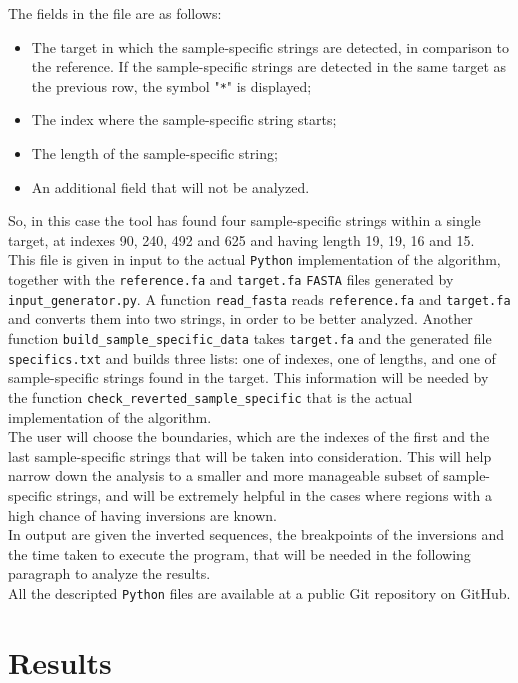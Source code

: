 The fields in the file are as follows:
\begin{itemize}
\item The target in which the sample-specific strings are detected, in comparison to the reference. If the sample-specific strings are detected in the same target as the previous row, the symbol "\texttt{*}" is displayed;
\item The index where the sample-specific string starts;
\item The length of the sample-specific string;
\item An additional field that will not be analyzed. 
\end{itemize}

So, in this case the tool has found four sample-specific strings within a single target, at indexes 90, 240, 492 and 625 and having length 19, 19, 16 and 15. \\
This file is given in input to the actual \texttt{Python} implementation of the algorithm, together with the \texttt{reference.fa} and \texttt{target.fa} \texttt{FASTA} files generated by \texttt{input\_generator.py}. A function \texttt{read\_fasta} reads \texttt{reference.fa} and \texttt{target.fa} and converts them into two strings, in order to be better analyzed. Another function \texttt{build\_sample\_specific\_data} takes  \texttt{target.fa} and the generated file  \texttt{specifics.txt} and builds three lists: one of indexes, one of lengths, and one of sample-specific strings found in the target. This information will be needed by the function  \texttt{check\_reverted\_sample\_specific} that is the actual implementation of the algorithm. \\
The user will choose the boundaries, which are the indexes of the first and the last sample-specific strings that will be taken into consideration. This will help narrow down the analysis to a smaller and more manageable subset of sample-specific strings, and will be extremely helpful in the cases where regions with a high chance of having inversions are known. \\
In output are given the inverted sequences, the breakpoints of the inversions and the time taken to execute the program, that will be needed in the following paragraph to analyze the results. \\
All the descripted \texttt{Python} files are available at a public Git repository \cite{cambiago_silviacambiagobachelor-thesis_2024} on GitHub.

\section{Results}

